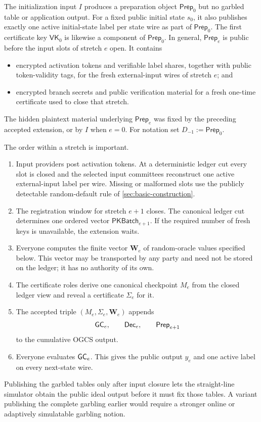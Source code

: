 The initialization input $I$ produces a preparation object
$\mathsf{Prep}_0$ but no garbled table or application output.  For a fixed
public initial state $s_0$, it also publishes exactly one active initial-state
label per state wire as part of $\mathsf{Prep}_0$.  The first certificate key
$\mathsf{VK}_0$ is likewise a component of $\mathsf{Prep}_0$.  In general,
$\mathsf{Prep}_e$ is public before the input
slots of stretch $e$ open.  It contains
\begin{itemize}
  \item encrypted activation tokens and verifiable label shares, together
    with public token-validity tags, for the fresh external-input wires of
    stretch $e$; and
  \item encrypted branch secrets and public verification material for a
    fresh one-time certificate used to close that stretch.
\end{itemize}
The hidden plaintext material underlying $\mathsf{Prep}_e$ was fixed by the
preceding accepted extension, or by $I$ when $e=0$.  For notation set
$D_{-1}:=\mathsf{Prep}_0$.

The order within a stretch is important.
\begin{enumerate}
  \item Input providers post activation tokens.  At a deterministic ledger
    cut every slot is closed and the selected input committees reconstruct one
    active external-input label per wire.  Missing or malformed slots use the
    publicly detectable random-default rule of
    \cref{sec:basic-construction}.
  \item The registration window for stretch $e+1$ closes.  The canonical
    ledger cut determines one ordered vector $\mathsf{PKBatch}_{e+1}$.  If the
    required number of fresh keys is unavailable, the extension waits.
  \item Everyone computes the finite vector $\mathbf W_e$ of random-oracle
    values specified below.  This vector may be transported by any party and
    need not be stored on the ledger; it has no authority of its own.
  \item The certificate roles derive one canonical checkpoint $M_e$ from the
    closed ledger view and reveal a certificate $\Sigma_e$ for it.
  \item The accepted triple $(M_e,\Sigma_e,\mathbf W_e)$ appends
    \[
      \mathsf{GC}_e,\qquad \mathsf{Dec}_e,\qquad \mathsf{Prep}_{e+1}
      \label{eq:stretch-output}
    \]
    to the cumulative OGCS output.
  \item Everyone evaluates $\mathsf{GC}_e$.  This gives the public output $y_e$ and
    one active label on every next-state wire.
\end{enumerate}
Publishing the garbled tables only after input closure lets the straight-line
simulator obtain the public ideal output before it must fix those tables.  A
variant publishing the complete garbling earlier would require a stronger
online or adaptively simulatable garbling notion.

